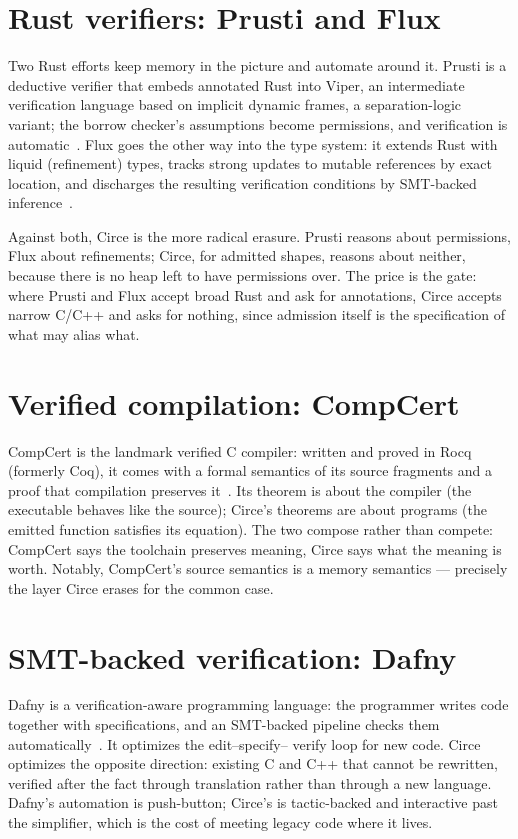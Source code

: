 \section{Rust verifiers: Prusti and Flux}

Two Rust efforts keep memory in the picture and automate around it.
Prusti is a deductive verifier that embeds annotated Rust into Viper, an
intermediate verification language based on implicit dynamic frames, a
separation-logic variant; the borrow checker's assumptions become
permissions, and verification is automatic~\cite{prusti}. Flux goes the
other way into the type system: it extends Rust with liquid (refinement)
types, tracks strong updates to mutable references by exact location,
and discharges the resulting verification conditions by SMT-backed
inference~\cite{flux}.

Against both, Circe is the more radical erasure. Prusti reasons about
permissions, Flux about refinements; Circe, for admitted shapes, reasons
about neither, because there is no heap left to have permissions over.
The price is the gate: where Prusti and Flux accept broad Rust and ask
for annotations, Circe accepts narrow C/C++ and asks for nothing, since
admission itself is the specification of what may alias what.

\section{Verified compilation: CompCert}

CompCert is the landmark verified C compiler: written and proved in
Rocq (formerly Coq), it comes with a formal semantics of its source
fragments and a proof that compilation preserves it~\cite{compcert}.
Its theorem is about the compiler (the executable behaves like the
source); Circe's theorems are about programs (the emitted function
satisfies its equation). The two compose rather than compete: CompCert
says the toolchain preserves meaning, Circe says what the meaning is
worth. Notably, CompCert's source semantics is a memory semantics ---
precisely the layer Circe erases for the common case.

\section{SMT-backed verification: Dafny}

Dafny is a verification-aware programming language: the programmer
writes code together with specifications, and an SMT-backed pipeline
checks them automatically~\cite{dafny}. It optimizes the edit--specify--
verify loop for new code. Circe optimizes the opposite direction:
existing C and C++ that cannot be rewritten, verified after the fact
through translation rather than through a new language. Dafny's
automation is push-button; Circe's is tactic-backed and interactive past
the simplifier, which is the cost of meeting legacy code where it lives.

